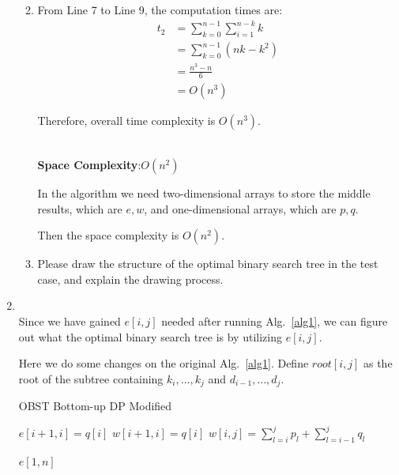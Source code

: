 \documentclass[12pt,a4paper]{article}
\makeatletter
\newtheorem*{solution}{Solution}
\theoremstyle{definition}
\renewenvironment{solution}[1][Solution] {\par\pushQED{\qed}\normalfont\topsep6\p@\@plus6\p@\relax\trivlist\item[\hskip\labelsep\bfseries#1\@addpunct{.}]\ignorespaces}{\popQED\endtrivlist\@endpefalse} \makeatother
\makeatother
\begin{document}
\begin{enumerate}
\begin{enumerate}
\begin{solution}
			From Line 7 to Line 9, the computation times are:
			\begin{equation}
			    \begin{split}
			        \displaystyle t_2 &= \sum_{k=0}^{n-1}\sum_{i=1}^{n-k} k\\
			        &= \sum_{k=0}^{n-1}(nk-k^2)\\
			        &= \frac{n^3 - n}{6}\\
			        &= O(n^3)
			    \end{split}
			\end{equation}
			
			Therefore, overall time complexity is $O(n^3)$.
			
			~\\
			\textbf{Space Complexity}:$O(n^2)$
			
			In the algorithm we need two-dimensional arrays to store the middle results, which are $e, w$, and one-dimensional arrays, which are $p, q$.
			
			Then the space complexity is $O(n^2)$.
			
			\end{solution}
			\item Please draw the structure of the optimal binary search tree in the test case, and explain the drawing process.   
		\end{enumerate}
		    \begin{solution}
		    ~\\
	    Since we have gained $e[i,j]$ needed after running Alg.~\ref{alg1}, we can figure out what the optimal binary search tree is by utilizing $e[i,j]$.
	    
	    Here we do some changes on the original Alg.~\ref{alg1}. Define $root[i,j]$ as the root of the subtree containing $k_i,...,k_j$ and $d_{i-1},...,d_j$.
	    
	     \begin{algorithm}[H]
               \caption{OBST Bottom-up DP Modified}\label{alg2}
               {
                    $e[i+1,i]=q[i]$\;
                    $w[i+1,i]=q[i]$\;
               }
               {
                    {
                        $w[i,j]=\sum_{l=i}^{j} p_{l}+\sum_{l=i-1}^{j} q_{l}$
                    }
               }
               
               \Return $e[1,n]$
            			

\end{algorithm}
\end{solution}
\end{enumerate}
\end{document}
